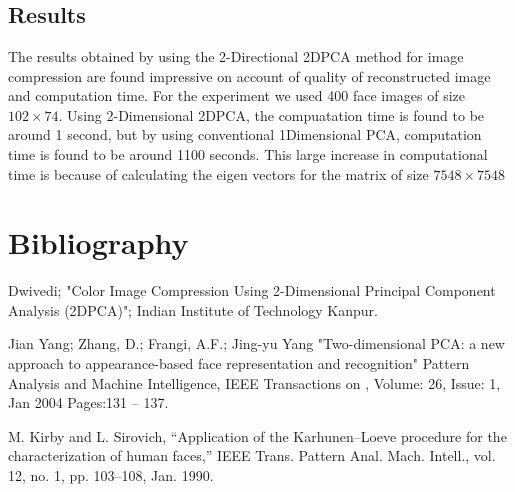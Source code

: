 \documentclass[a4paper, 12pt, notitlepage]{report}
\begin{document}
\chapter{}
\section{Results}
The results obtained by using the 2-Directional 2DPCA method for image compression are found impressive on account of quality of reconstructed image and computation time. For the experiment we used 400 face images of size $102 \times 74$. Using 2-Dimensional 2DPCA, the compuatation time is found to be around 1 second, but by using conventional 1Dimensional PCA, computation time is found to be around 1100 seconds. This large increase in computational time is because of calculating the eigen vectors for the matrix of size $7548 \times 7548$  

\chapter*{Bibliography}
%
\begin{description}

\item Dwivedi; "Color Image Compression Using 2-Dimensional Principal Component Analysis (2DPCA)"; Indian Institute of Technology Kanpur.

\item Jian Yang; Zhang, D.; Frangi, A.F.; Jing-yu Yang
"Two-dimensional PCA: a new approach to appearance-based face representation and recognition" Pattern Analysis and Machine Intelligence, IEEE Transactions on , Volume: 26, Issue: 1, Jan 2004 Pages:131 – 137.

\item M. Kirby and L. Sirovich, “Application of the Karhunen–Loeve procedure for the characterization of human faces,” IEEE Trans. Pattern Anal. Mach. Intell., vol. 12, no. 1, pp. 103–108, Jan. 1990.

\end{description}
\end{document}
